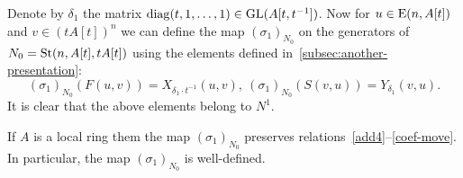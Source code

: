 Denote by $\delta_1$ the matrix $\mathrm{diag}(t, 1, \ldots, 1) \in \operatorname{GL}(A[t, t^{-1}])$.
Now for $u \in \operatorname{E}(n, A[t])$ and $v \in (tA[t])^n$ we can define the map $(\sigma_1)_{N_0}$ on the generators of $N_{0}=\operatorname{St}(n, A[t], tA[t])$
using the elements defined in~\cref{subsec:another-presentation}:
\begin{equation*}
(\sigma_1)
    _{N_0} (F(u, v)) = X_{\delta_1 \cdot t^{-1}}(u, v),\ (\sigma_1)_{N_0} (S(v, u)) = Y_{\delta_1}(v, u).
\end{equation*}
It is clear that the above elements belong to $N^1$.

\begin{prop}
    If $A$ is a local ring them the map $(\sigma_1)_{N_0}$ preserves relations~\eqref{add4}--\eqref{coef-move}.
    In particular, the map $(\sigma_1)_{N_0}$ is well-defined.
\end{prop}
